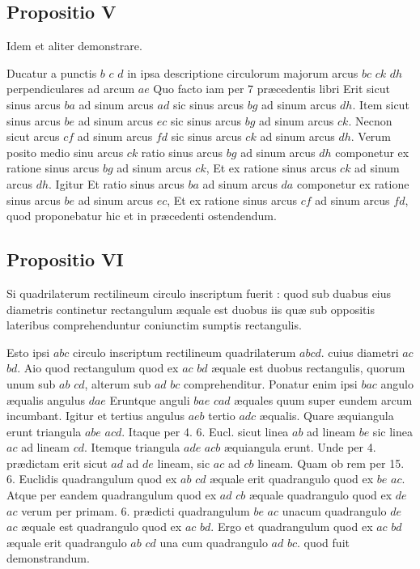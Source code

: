 \documentclass[11pt,a4paper]{article}
\begin{document}
\subsection*{Propositio V}

Idem et aliter demonstrare.

Ducatur a punctis $b$ $c$ $d$ in ipsa descriptione circulorum majorum arcus $bc$ $ck$ $dh$ perpendiculares ad arcum $ae$ Quo facto iam per 7 præcedentis libri Erit sicut sinus arcus $ba$ ad sinum arcus $ad$ sic sinus arcus $bg$ ad sinum arcus $dh$. Item sicut sinus arcus $be$ ad sinum arcus $ec$ sic sinus arcus $bg$ ad sinum arcus $ck$. Necnon sicut arcus $cf$ ad sinum arcus $fd$ sic sinus arcus $ck$ ad sinum arcus $dh$. Verum posito medio sinu arcus $ck$ ratio sinus arcus $bg$ ad sinum arcus $dh$ componetur ex ratione sinus arcus $bg$ ad sinum arcus $ck$, Et ex ratione sinus arcus $ck$ ad sinum arcus $dh$. Igitur Et ratio sinus arcus $ba$ ad sinum arcus $da$ componetur ex ratione sinus arcus $be$ ad sinum arcus $ec$, Et ex ratione sinus arcus $cf$ ad sinum arcus $fd$, quod proponebatur hic et in præcedenti ostendendum.

\subsection*{Propositio VI}

Si quadrilaterum rectilineum circulo inscriptum fuerit : quod sub duabus eius diametris continetur rectangulum æquale est duobus iis quæ sub oppositis lateribus comprehenduntur coniunctim sumptis rectangulis.

Esto ipsi $abc$ circulo inscriptum rectilineum quadrilaterum $abcd$. cuius diametri $ac$ $bd$. Aio quod rectangulum quod ex $ac$ $bd$ æquale est duobus rectangulis, quorum unum sub $ab$ $cd$, alterum sub $ad$ $bc$ comprehenditur. Ponatur enim ipsi $bac$ angulo æqualis angulus $dae$ Eruntque anguli $bae$ $cad$ æquales quum super eundem arcum incumbant. Igitur et tertius angulus $aeb$ tertio $adc$ æqualis. Quare æquiangula erunt triangula $abe$ $acd$. Itaque per 4. 6. Eucl. sicut linea $ab$ ad lineam $be$ sic linea $ac$ ad lineam $cd$. Itemque triangula $ade$ $acb$ æquiangula erunt. Unde per 4. prædictam erit sicut $ad$ ad $de$ lineam, sic $ac$ ad $cb$ lineam. Quam ob rem per 15. 6. Euclidis quadrangulum quod ex $ab$ $cd$ æquale erit quadrangulo quod ex $be$ $ac$. Atque per eandem quadrangulum quod ex $ad$ $cb$ æquale quadrangulo quod ex $de$ $ac$ verum per primam. 6. prædicti quadrangulum $be$ $ac$ unacum quadrangulo $de$ $ac$ æquale est quadrangulo quod ex $ac$ $bd$. Ergo et quadrangulum quod ex $ac$ $bd$ æquale erit quadrangulo $ab$ $cd$ una cum quadrangulo $ad$ $bc$. quod fuit demonstrandum.
\end{document}

